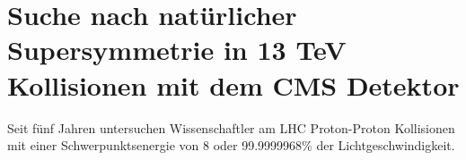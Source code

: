 \documentclass[11pt,a4paper]{article}
\begin{document}
\def\gluino{\mbox{$\tilde g$}\xspace}
\def\mgluino{\mbox{$m_{\tilde g}$}\xspace}
\def\mStop{\mbox{$m_{\tilde t}$}\xspace}
\def\mSbottom{\mbox{$m_{\tilde b}$}\xspace}
\def\mCha{\mbox{$m_{\tilde{\chi}^{\pm}_1}$}\xspace}
\def\mNeu{\mbox{$m_{\tilde{\chi}^{0}_1}$}\xspace}
\def\nbtags{\mbox{$n_{\cPqb\textrm{-tag}}$}\xspace}
\def\njets{\mbox{$n_{\textrm{jets}}$}\xspace}
\def\mT{\mbox{$m_{\textrm{T}}$}\xspace}
\newcommand{\jptratio}[2]{\mbox{$p_{\textrm{T\,\vline\,#1,#2}}^{\textrm{ratio}}$}\xspace}
\newcommand{\ptb}[1]{\mbox{$p_{\textrm{T}}^{}(b_#1)$}\xspace}
\def\mTW{\mbox{$m_{\textrm{T}2}^W$}\xspace}
\def\HT{\mbox{$H_{\textrm{T}}$}\xspace}
\def\HTratio{\mbox{$H_{\textrm{T}}^{\textrm{ratio}}$}\xspace}
\def\dphi{\mbox{$\Delta\phi(W,l)$}\xspace}
\def\dphimet{\mbox{$\Delta\phi(\ETmiss,j_{1,2})$}\xspace}
\def\ttjets{\mbox{\ensuremath{\cmsSymbolFace{t}\overline{\cmsSymbolFace{t}}}+jets}\xspace}
\def\wjets{\mbox{\ensuremath{W}+jets}\xspace}
\newcommand{\fixme}[1]{\textcolor{red}{FIXME: #1}} %
\newcommand{\tobechecked}[1]{\textcolor{red}{#1}\marginpar{\textcolor{red}{\textbf{X}}}}
\newcommand{\boldStart}[1]{\noindent{\bf{#1}}}
\onehalfspacing
\addtolength{\leftmargin}{-2in}
\thispagestyle{empty}

\section*{Suche nach nat\"urlicher Supersymmetrie in 13 TeV Kollisionen mit dem CMS Detektor}

Seit f\"unf Jahren untersuchen Wissenschaftler am LHC Proton-Proton Kollisionen mit einer Schwerpunktsenergie von 8 \TeV oder 99.9999968\% der Lichtgeschwindigkeit.
\end{document}
